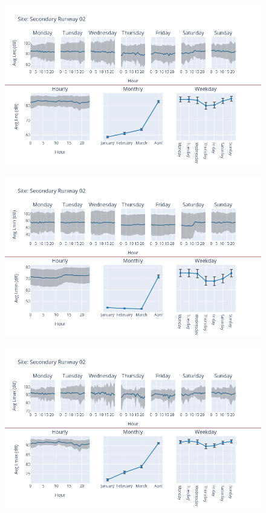 \documentclass[12pt, oneside]{book}
\begin{document}
{ 
{\begin{figure}[H] 
 \centering 
\includegraphics[width=.88\textwidth, keepaspectratio]{image179} 
 \end{figure}}{} 

{\begin{figure}[H] 
 \centering 
\includegraphics[width=.88\textwidth, keepaspectratio]{image180} 
 \end{figure}}{} 

{\begin{figure}[H] 
 \centering 
\includegraphics[width=.88\textwidth, keepaspectratio]{image181} 
 \end{figure}}{} 




}
\end{document}
